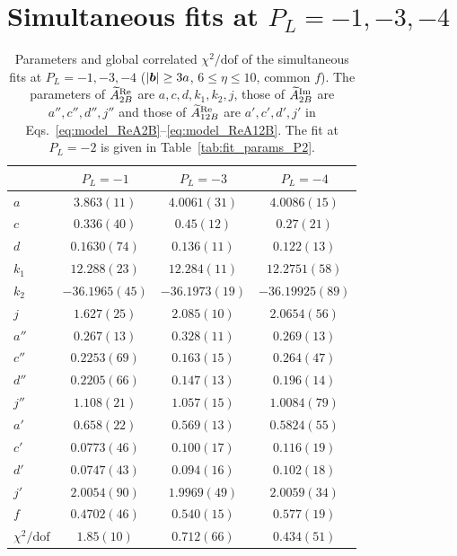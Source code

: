 \section{Simultaneous fits at $P_L=-1,-3,-4$}
\label{app:fit_results}

\begin{table}[!t]
\caption{Parameters and global correlated $\chi^2/\text{dof}$ of the simultaneous fits at $P_L=-1,-3,-4$ ($|\boldsymbol{b}|\ge3a$, $6\le\eta\le10$, common $f$). The parameters of $\widetilde{A}_{2B}^{\text{Re}}$ are $a,c,d,k_1,k_2,j$, those of $\widetilde{A}_{2B}^{\text{Im}}$ are $a'',c'',d'',j''$ and those of $\widetilde{A}_{12B}^{\text{Re}}$ are $a',c',d',j'$ in Eqs.~\eqref{eq:model_ReA2B}--\eqref{eq:model_ReA12B}. The fit at $P_L=-2$ is given in Table~\ref{tab:fit_params_P2}.}
\label{tab:fit_params}
\footnotesize
\setlength{\tabcolsep}{1.5pt}
\begin{ruledtabular}
\begin{tabular}{lccc}
 & $P_L=-1$ & $P_L=-3$ & $P_L=-4$ \\
\hline
$a$ & $3.863(11)$ & $4.0061(31)$ & $4.0086(15)$ \\
$c$ & $0.336(40)$ & $0.45(12)$ & $0.27(21)$ \\
$d$ & $0.1630(74)$ & $0.136(11)$ & $0.122(13)$ \\
$k_1$ & $12.288(23)$ & $12.284(11)$ & $12.2751(58)$ \\
$k_2$ & $-36.1965(45)$ & $-36.1973(19)$ & $-36.19925(89)$ \\
$j$ & $1.627(25)$ & $2.085(10)$ & $2.0654(56)$ \\
\hline
$a''$ & $0.267(13)$ & $0.328(11)$ & $0.269(13)$ \\
$c''$ & $0.2253(69)$ & $0.163(15)$ & $0.264(47)$ \\
$d''$ & $0.2205(66)$ & $0.147(13)$ & $0.196(14)$ \\
$j''$ & $1.108(21)$ & $1.057(15)$ & $1.0084(79)$ \\
\hline
$a'$ & $0.658(22)$ & $0.569(13)$ & $0.5824(55)$ \\
$c'$ & $0.0773(46)$ & $0.100(17)$ & $0.116(19)$ \\
$d'$ & $0.0747(43)$ & $0.094(16)$ & $0.102(18)$ \\
$j'$ & $2.0054(90)$ & $1.9969(49)$ & $2.0059(34)$ \\
\hline
$f$ & $0.4702(46)$ & $0.540(15)$ & $0.577(19)$ \\
\hline
$\chi^2/\text{dof}$ & $1.85(10)$ & $0.712(66)$ & $0.434(51)$ \\
\end{tabular}
\end{ruledtabular}
\end{table}

